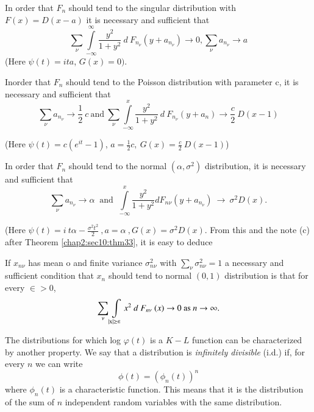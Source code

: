 \begin{theorem}\label{chap2:sec10:thm33} %
  In order that $F_n$ should tend to the singular distribution with
  $F(x)=D(x-a)$ it is necessary and sufficient that 
  $$
  \sum _\nu \int\limits^\infty_{-\infty}  \frac{y^2}{1+y^2}~d~
  F_{n_\nu}(y+a_{n_\nu}) \rightarrow 0, \sum _\nu a_{n_\nu}
  \rightarrow a 
  $$
  (Here $\psi(t)= ita$, $G(x)=0)$.
\end{theorem}

\begin{theorem}\label{chap2:sec10:thm34}%
In\pageoriginale order that $F_n$ should tend to the Poisson distribution with
parameter c, it is necessary and sufficient that  
$$
\sum_\nu a_{n_\nu} \to \frac{1}{2} ~c ~\text{and}~
\sum_\nu \int\limits^x_{-\infty} \frac{y^2}{1+y^2}~d ~F_{n_\nu}(y+
a_n)\rightarrow \frac{c}{2} ~ D(x-1)
$$ 

(Here $\psi(t)=c(e^{it}-1)$,  $a =\frac{1}{2}c, ~G(x)=\frac
{c}{2}~D(x-1)$) 
\end{theorem}

\begin{theorem}\label{chap2:sec10:thm35} %
  In order that $F_n$ should tend to the normal 
  $(\alpha,\sigma^2)$ distribution, it is necessary and sufficient that 
  $$
  \sum_\nu a_{n_\nu}\rightarrow \alpha ~\text{ and }~
  \int\limits^x_{-\infty} \frac{y^2}{1+y^2} d F_{n \nu}(y+a_{n_\nu})
  ~ \rightarrow~\sigma^2 D(x).  
  $$ 
  
  (Here $\psi(t)=i~t \alpha-\frac{\sigma^2 t^2}{2}~, a=\alpha ~,
  G(x)=\sigma^2 D(x)$.  From this and the note (c) after
  Theorem \ref{chap2:sec10:thm33}, it
  is easy to deduce 
\end{theorem}

\begin{theorem}[Liapounoff]\label{chap2:sec10:thm36} %
  If $x _{n \nu}$ has mean o and finite variance $\sigma^2_{n \nu}$\break
  with $\sum _\nu \sigma^2 _{n \nu}=1$ 
  a necessary and sufficient condition that $x_n$ should tend to
  normal $(0, 1)$ distribution is that for every $\in > 0$, 
  $$
  \sum_\nu \int\limits_{|\rm x|\ge \in} x^2 ~d~F_{n\nu}~(
  x)\rightarrow 0 ~\text{as}~ n \to \infty.  
  $$
  
  The distributions for which log $\varphi(t)$ is a $K-L$ function can be
  characterized by another property. We say that a distribution is   
  \textit{infinitely divisible} (i.d.) if, for every $n$ we can write
  $$
  \phi(t) = (\phi_n(t))^n
  $$\pageoriginale
  where $\phi_n  (t)$ is a characteristic function.  This means that it
  is the distribution of the sum of $n$ independent random variables with
  the same distribution. 
\end{theorem}

